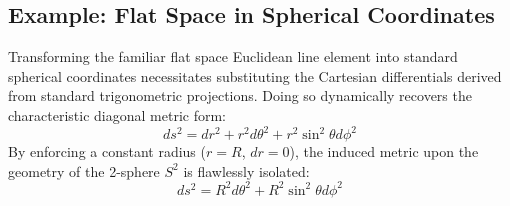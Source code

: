 \documentclass[11pt, a4paper]{report}
\begin{document}
\subsection*{Example: Flat Space in Spherical Coordinates}
Transforming the familiar flat space Euclidean line element into standard spherical coordinates necessitates substituting the Cartesian differentials derived from standard trigonometric projections. Doing so dynamically recovers the characteristic diagonal metric form:
\begin{equation} ds^2 = dr^2 + r^2 d\theta^2 + r^2\sin^2\theta d\phi^2 \end{equation}
By enforcing a constant radius ($r=R$, $dr=0$), the induced metric upon the geometry of the 2-sphere $S^2$ is flawlessly isolated:
\begin{equation} ds^2 = R^2 d\theta^2 + R^2\sin^2\theta d\phi^2 \end{equation}
\end{document}

